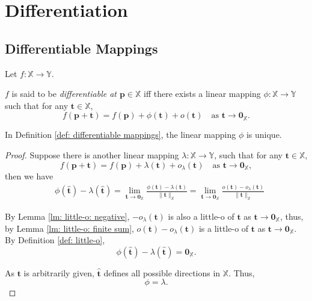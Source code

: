 \chapter{Differentiation}



\section{Differentiable Mappings}


\begin{definition}
	\label{def: differentiable mappings}
	
	Let $f: \mathbb X \to \mathbb Y$.
	
	$f$ is said to be \textit{differentiable at $\mathbf p \in \mathbb X$} iff there exists a linear mapping $\phi: \mathbb X \to \mathbb Y$ such that for any $\mathbf t \in \mathbb X$,
	$$
	f(\mathbf p + \mathbf t) = f(\mathbf p) + \phi(\mathbf t) + o(\mathbf t) \quad \text{as $\mathbf t \to \mathbf 0_{\mathbb X}$}.
	$$
\end{definition}


\begin{lemma}
	\label{lm: uniqueness of phi}
	
	In Definition \ref{def: differentiable mappings}, the linear mapping $\phi$ is unique.
	
	\begin{proof}
		Suppose there is another linear mapping $\lambda: \mathbb X \to \mathbb Y$, such that for any $\mathbf t \in \mathbb X$,
		$$
		f(\mathbf p + \mathbf t) = f(\mathbf p) + \lambda(\mathbf t) + o_\lambda (\mathbf t) \quad \text{as $\mathbf t \to \mathbf 0_{\mathbb X}$},
		$$
		then we have
		$$
		\begin{aligned}
			& \phi(\mathbf{\hat t}) - \lambda(\mathbf{\hat t}) = \lim_{\mathbf t \to \mathbf 0_{\mathbb X}}\frac{\phi(\mathbf t) - \lambda(\mathbf t)}{\| \mathbf t \|_{\mathbb X}} = \lim_{\mathbf t \to \mathbf 0_{\mathbb X}} \frac{o(\mathbf t) - o_\lambda(\mathbf t)}{\| \mathbf t\|_{\mathbb X}}
		\end{aligned}
		$$
		
		By Lemma \ref{lm: little-o: negative}, $-o_{\lambda}(\mathbf t)$ is also a little-o of $\mathbf t$ as $\mathbf t \to \mathbf 0_{\mathbb X}$, thus, by Lemma \ref{lm: little-o: finite sum}, $o(\mathbf t) - o_\lambda(\mathbf t)$ is a little-o of $\mathbf t$ as $\mathbf t \to \mathbf 0_{\mathbb X}$. By Definition \ref{def: little-o},
		$$
		\phi(\mathbf{\hat t}) - \lambda(\mathbf{\hat t}) = \mathbf 0_{\mathbb X}.
		$$
		
		As $\mathbf t$ is arbitrarily given, $\mathbf{\hat t}$ defines all possible directions in $\mathbb X$. Thus,
		$$
		\phi = \lambda.
		$$
	\end{proof}
\end{lemma}



